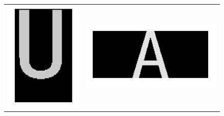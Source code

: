 \documentclass[a4paper,12pt,titlepage]{report}
\begin{document}
	\begin{figure}[h!]
		\begin{center}
			\begin{tabular}{cc}
			\includegraphics[scale=0.12]{../illus/tuile.png} &
			\includegraphics[scale=0.18]{../illus/2ech.png} \\	

\end{tabular}
\end{center}
\end{figure}
\end{document}
